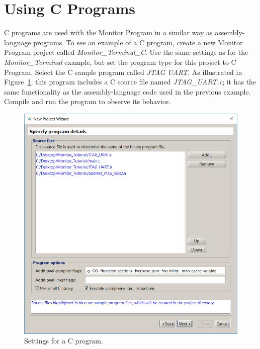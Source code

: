 \documentclass[11pt, twoside, pdftex]{article}
\begin{document}
\section{Using C Programs}

C programs are used with the Monitor Program in a similar way as
assembly-language programs. To see an example of a C program,
create a new Monitor Program project called 
{\it Monitor\_Terminal\_C}. Use the same settings as for the
{\it Monitor\_Terminal} example, but set the program type for
this project to {\sf C Program}.
Select the C sample program called {\it JTAG UART}.  
As illustrated in Figure~\ref{fig:24}, this program includes a C source
file named {\it JTAG\_UART.c}; it has the same functionality as
the assembly-language code used in the previous example. 
Compile and run the program to observe its behavior.

\begin{figure}[H]
   \begin{center}
      \includegraphics[scale=0.5]{screenshots/figure24.png}
   \end{center}
   \caption{Settings for a C program.} 
	 \label{fig:24}
\end{figure}
\end{document}
